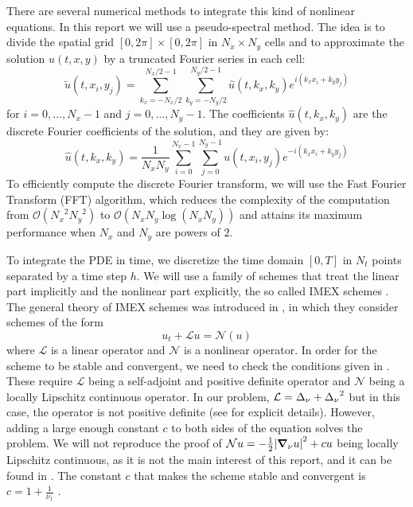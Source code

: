 \documentclass[twoside]{article}
\begin{document}
There are several numerical methods to integrate this kind of nonlinear equations. In this report we will use a pseudo-spectral method. The idea is to divide the spatial grid $[0,2\pi]\times [0,2\pi]$ in $N_x \times N_y$ cells and to approximate the solution $u(t,x,y)$ by a truncated Fourier series in each cell:
\begin{equation}\label{eq:idft}
  \tilde{u}(t,x_i,y_j) = \sum_{k_x=-N_x/2}^{N_x/2-1} \sum_{k_y=-N_y/2}^{N_y/2-1} \hat{u}(t,k_x,k_y) e^{i(k_x x_i + k_y y_j)}
\end{equation}
for $i=0,\dots,N_x-1$ and $j=0,\dots,N_y-1$. The coefficients $\hat{u}(t,k_x,k_y)$ are the discrete Fourier coefficients of the solution, and they are given by:
\begin{equation}\label{eq:dft}
  \hat{u}(t,k_x,k_y) = \frac{1}{N_x N_y} \sum_{i=0}^{N_x-1} \sum_{j=0}^{N_y-1} u(t,x_i,y_j) e^{-i(k_x x_i + k_y y_j)}
\end{equation}
To efficiently compute the discrete Fourier transform, we will use the Fast Fourier Transform (FFT) algorithm, which reduces the complexity of the computation from $\mathcal{O}({N_x}^2 {N_y}^2)$ to $\mathcal{O}(N_x N_y \log(N_x N_y))$ and attains its maximum performance when $N_x$ and $N_y$ are powers of $2$.

To integrate the PDE in time, we discretize the time domain $[0,T]$ in $N_t$ points separated by a time step $h$. We will use a family of schemes that treat the linear part implicitly and the nonlinear part explicitly, the so called IMEX schemes \cite{Akrivis_kuramoto}. The general theory of IMEX schemes was introduced in \cite{Akrivis2004}, in which they consider schemes of the form
\begin{equation}\label{eq:nonlinear_pde}
  u_t+\mathcal{L}u=\mathcal{N}(u)
\end{equation}
where $\mathcal{L}$ is a linear operator and $\mathcal{N}$ is a nonlinear operator. In order for the scheme to be stable and convergent, we need to check the conditions given in \cite{Akrivis2004}. These require $\mathcal{L}$ being a self-adjoint and positive definite operator and $\mathcal{N}$ being a locally Lipschitz continuous operator. In our problem, $\mathcal{L}=\Delta_\nu + {\Delta_\nu}^2$ but in this case, the operator is not positive definite (see \cite{phdthesis_anna} for explicit details). However, adding a large enough constant $c$ to both sides of the equation solves the problem. We will not reproduce the proof of $\mathcal{N}u=-\frac{1}{2} \abs{\grad_\nu u}^2 + cu$ being locally Lipschitz continuous, as it is not the main interest of this report, and it can be found in \cite{Akrivis_kuramoto}. The constant $c$ that makes the scheme stable and convergent is $c=1+\frac{1}{\nu_1}$ \cite{phdthesis_anna}.
\end{document}
